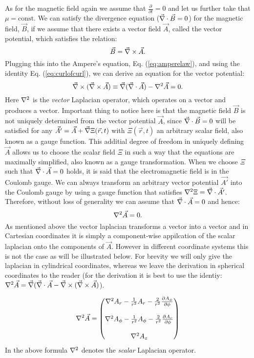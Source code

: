 \documentclass[10pt,a4paper]{report}
\def\Nabla{\ensuremath\vec{\nabla}}
\def\curl{\ensuremath\Nabla\times}
\def\div{\ensuremath\Nabla\cdot}
\def\lap{\ensuremath\nabla^2}
\def\vlap{\ensuremath\nabla^2}
\begin{document}
As for the magnetic field again we assume that $ \frac{\partial}{\partial t} = 0 $ and let us further take that $\mu = \text{const}$. We can satisfy the divergence equation ($\div \vec{B} = 0 $) for the magnetic field, $\vec{B}$, if we assume that there exists a vector field $\vec{A}$, called the vector potential, which satisfies the relation: 
\begin{equation*}
  \vec{B} = \curl \vec{A}.
\end{equation*}
Plugging this into the Ampere's equation, Eq. (\ref{eq:amperelaw}), and using the identity Eq. (\ref{eq:curlofcurl}), we can derive an equation for the vector potential: 
\begin{equation*}
  \curl (\curl \vec{A}) \equiv \Nabla(\div \vec{A})-\vlap{\vec{A}} = 0.
\end{equation*}
Here $\vlap$ is the \emph{vector} Laplacian operator, which operates on a vector and produces a vector. Important thing to notice here is that the magnetic field $\vec{B}$ is not uniquely determined from the vector potential $\vec{A}$, since $\div{\vec{B}}=0$ will be satisfied for any $\vec{A'} = \vec{A}+\Nabla{\Xi(\vec{r},t)}$ with $\Xi(\vec{r},t)$ an arbitrary scalar field, also known as a gauge function. This additial degree of freedom in uniquely defining $\vec{A}$ allows us to choose the scalar field $\Xi$ in such a way that the equations are maximally simplified, also known as a gauge transformation. When we choose $\Xi$ such that $\div \vec{A} = 0 $ holds, it is said that the electromagnetic field is in the Coulomb gauge. We can always transform an arbitrary vector potential $\vec{A'}$ into the Coulomb gauge by using a gauge function that satisfies $\lap \Xi = \div \vec{A'}$. Therefore, without loss of generality we can assume that $\div {\vec{A}= 0 }$ and hence:
\begin{equation*}
  \vlap \vec{A} = 0.
\end{equation*}
As mentioned above the vector laplacian transforms a vector into a vector and in Cartesian coordinates it is simply a component-wise appilcation of the scalar laplacian onto the components of $\vec{A}$. However in different coordinate systems this is not the case as will be illustrated below. For brevity we will only give the laplacian in cylindrical coordinates, whereas we leave the derivation in spherical coordinates to the reader (for the derivation it is best to use the identiy: $\vlap \vec{A} = \Nabla (\div{\vec{A}}-\curl(\curl \vec{A})$).

\begin{equation*}
  \vlap \vec{A} =
  \begin{pmatrix} 
    \lap A_r - \frac{1}{r^2}A_r-\frac{2}{r^2}\frac{\partial A_\phi}{\partial \phi} \\ \\
    \lap A_\phi - \frac{1}{r^2}A_\phi-\frac{2}{r^2}\frac{\partial A_r}{\partial \phi} \\ \\    
    \lap A_z
  \end{pmatrix}
\end{equation*}  
In the above formula $\lap$ denotes the \emph{scalar} Laplacian operator. \\ 
\end{document}
